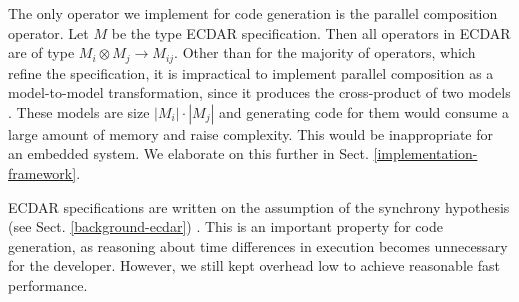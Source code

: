 The only operator we implement for code generation is the parallel
composition operator. Let $M$ be the type ECDAR specification. Then
all operators in ECDAR are of type $M_{i}\otimes M_{j}\rightarrow M_{ij}$.
Other than for the majority of operators, which refine the specification,
it is impractical to implement parallel composition as a model-to-model
transformation, since it produces the cross-product of two models
\cite{david_compositional_2012}. These models are size $|M_{i}|\cdot|M_{j}|$
and generating code for them would consume a large amount of memory
and raise complexity. This would be inappropriate for an embedded
system. We elaborate on this further in Sect. \ref{implementation-framework}.

ECDAR specifications are written on the assumption of the synchrony
hypothesis (see Sect. \ref{background-ecdar}) \cite{david_compositional_2012}.
This is an important property for code generation, as reasoning about
time differences in execution becomes unnecessary for the developer.
However, we still kept overhead low to achieve reasonable fast performance.



